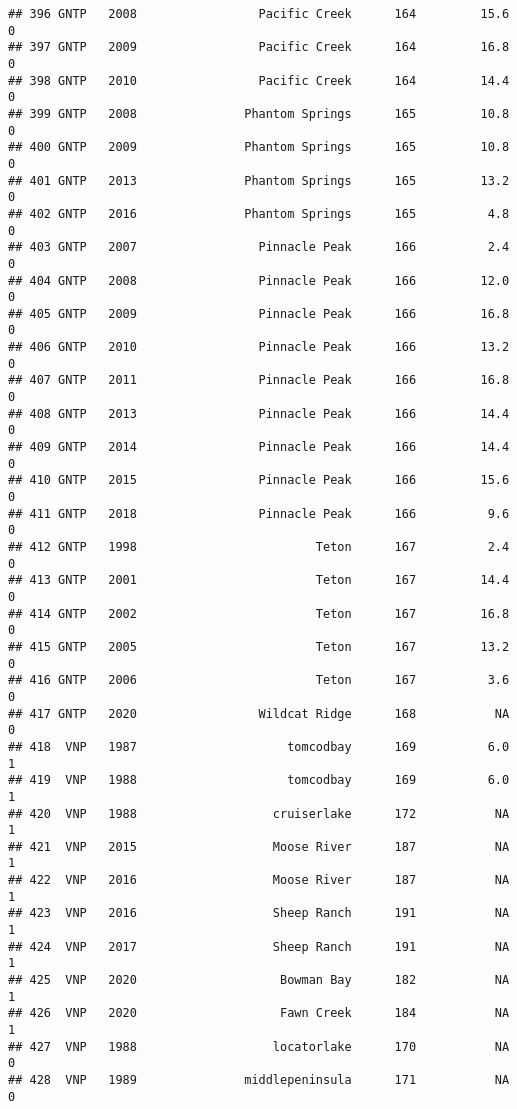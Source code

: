 \documentclass[
]{article}
\begin{document}
\begin{verbatim}
## 396 GNTP   2008                 Pacific Creek      164         15.6       0
## 397 GNTP   2009                 Pacific Creek      164         16.8       0
## 398 GNTP   2010                 Pacific Creek      164         14.4       0
## 399 GNTP   2008               Phantom Springs      165         10.8       0
## 400 GNTP   2009               Phantom Springs      165         10.8       0
## 401 GNTP   2013               Phantom Springs      165         13.2       0
## 402 GNTP   2016               Phantom Springs      165          4.8       0
## 403 GNTP   2007                 Pinnacle Peak      166          2.4       0
## 404 GNTP   2008                 Pinnacle Peak      166         12.0       0
## 405 GNTP   2009                 Pinnacle Peak      166         16.8       0
## 406 GNTP   2010                 Pinnacle Peak      166         13.2       0
## 407 GNTP   2011                 Pinnacle Peak      166         16.8       0
## 408 GNTP   2013                 Pinnacle Peak      166         14.4       0
## 409 GNTP   2014                 Pinnacle Peak      166         14.4       0
## 410 GNTP   2015                 Pinnacle Peak      166         15.6       0
## 411 GNTP   2018                 Pinnacle Peak      166          9.6       0
## 412 GNTP   1998                         Teton      167          2.4       0
## 413 GNTP   2001                         Teton      167         14.4       0
## 414 GNTP   2002                         Teton      167         16.8       0
## 415 GNTP   2005                         Teton      167         13.2       0
## 416 GNTP   2006                         Teton      167          3.6       0
## 417 GNTP   2020                 Wildcat Ridge      168           NA       0
## 418  VNP   1987                     tomcodbay      169          6.0       1
## 419  VNP   1988                     tomcodbay      169          6.0       1
## 420  VNP   1988                   cruiserlake      172           NA       1
## 421  VNP   2015                   Moose River      187           NA       1
## 422  VNP   2016                   Moose River      187           NA       1
## 423  VNP   2016                   Sheep Ranch      191           NA       1
## 424  VNP   2017                   Sheep Ranch      191           NA       1
## 425  VNP   2020                    Bowman Bay      182           NA       1
## 426  VNP   2020                    Fawn Creek      184           NA       1
## 427  VNP   1988                   locatorlake      170           NA       0
## 428  VNP   1989               middlepeninsula      171           NA       0

\end{verbatim}
\end{document}
